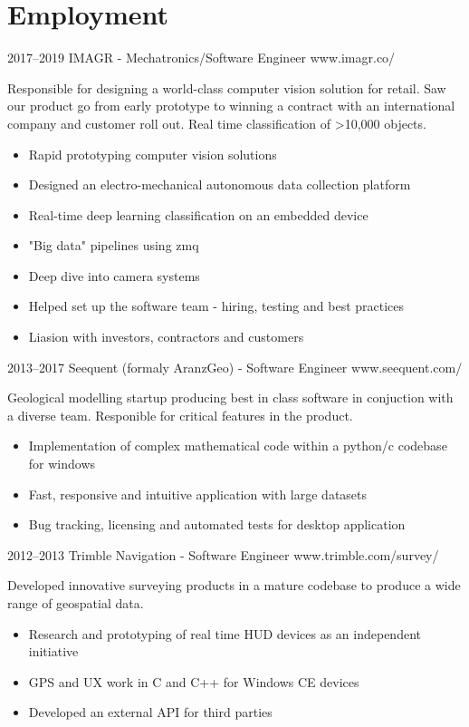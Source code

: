 \documentclass[print]{friggeri-cv} %
\begin{document}
\section{Employment}
\begin{entrylist}
\entry
{2017--2019}
{IMAGR - Mechatronics/Software Engineer}
{www.imagr.co/}
{Responsible for designing a world-class computer vision solution for retail. Saw our product go from early prototype to winning a contract with an international company and customer roll out. Real time classification of >10,000 objects.
\begin{itemize}
\item Rapid prototyping computer vision solutions
\item Designed an electro-mechanical autonomous data collection platform
\item Real-time deep learning classification on an embedded device
\item "Big data" pipelines using zmq
\item Deep dive into camera systems
\item Helped set up the software team - hiring, testing and best practices
\item Liasion with investors, contractors and customers
\end{itemize}}

\entry
{2013--2017}
{Seequent (formaly AranzGeo) - Software Engineer}
{www.seequent.com/}
{Geological modelling startup producing best in class software in conjuction with a diverse team. Responible for critical features in the product.
\begin{itemize}
\item Implementation of complex mathematical code within a python/c codebase for windows
\item Fast, responsive and intuitive application with large datasets
\item Bug tracking, licensing and automated tests for desktop application
\end{itemize}}

\entry
{2012--2013}
{Trimble Navigation - Software Engineer}
{www.trimble.com/survey/}
{Developed innovative surveying products in a mature codebase to produce a wide range of geospatial data.
\begin{itemize}
\item Research and prototyping of real time HUD devices as an independent initiative
\item GPS and UX work in C and C++ for Windows CE devices
\item Developed an external API for third parties
\end{itemize}}


\end{entrylist}
\end{document}

